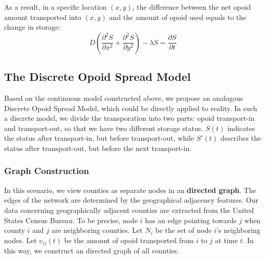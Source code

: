 
As a result, in a specific location $(x,y)$, the difference between the net opoid amount transported into $(x,y)$ and the amount of opoid used equals to the change in storage:
\begin{equation}
D(\frac{\partial^2 S}{\partial x^2} + \frac{\partial^2 S}{\partial y^2}) - \lambda S = \frac{\partial S}{\partial t} 
\end{equation}
\begin{comment}
$S$, however, is unknown. We substitute (1) into (3), and eliminate the common factor $k$ from both sides of the equation
\begin{equation}
D(\frac{\partial^2 F}{\partial x^2} + \frac{\partial^2 F}{\partial y^2}) - \lambda F = \frac{\partial F}{\partial t}
\end{equation}
\end{comment}

\subsection{The Discrete Opoid Spread Model}
Based on the continuous model constructed above, we propose an analogous Discrete Opoid Spread Model, which could be directly applied to reality. In such a discrete model, we divide the transporation into two parts: opoid transport-in and transport-out, so that we have two different storage status. $S(t)$ indicates the status after transport-in, but before transport-out, while $S'(t)$ describes the status after transport-out, but before the next transport-in.

\subsubsection{Graph Construction}
In this scenario, we view counties as separate nodes in an \textbf{directed graph}. The edges of the network are determined by the geographical adjacency features. Our data concerning geographically adjacent counties are extracted from the United States Census Bureau\cite{13}. To be precise, node $i$ has an edge pointing towards $j$ when county $i$ and $j$ are neighboring counties. Let $N_i$ be the set of node $i$'s neighboring nodes. Let $v_{ij}(t)$ be the amount of opoid transported from $i$ to $j$ at time $t$. In this way, we construct an directed graph of all counties. 

